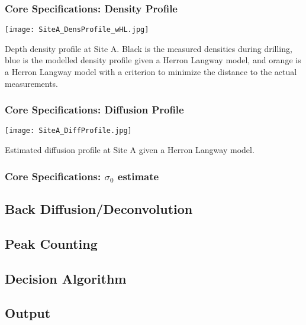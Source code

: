 \documentclass[../../CompleteThesis/Complete_1stDraft.tex]{subfiles}
\begin{document}
\subsubsection[Density Profile]{Core Specifications: Density Profile}
\begin{marginfigure}
	\centering
	\texttt{[image: SiteA\_DensProfile\_wHL.jpg]}
	\caption[Density profile Site A]{\footnotesize{Depth density profile at Site A. Black is the measured densities during drilling, blue is the modelled density profile given a Herron Langway model, and orange is a Herron Langway model with a criterion to minimize the distance to the actual measurements.}}
	\label{Fig:SiteA_DensProfile_wHL}
\end{marginfigure}


\subsubsection[Diffusion Profile]{Core Specifications: Diffusion Profile}
\begin{marginfigure}
	\centering
	\texttt{[image: SiteA\_DiffProfile.jpg]}
	\caption[Diffusion profile, Site A.]{\footnotesize{Estimated diffusion profile at Site A given a Herron Langway model.}}
	\label{fig:SiteADiffProfile}
\end{marginfigure}

\subsubsection[$\sigma_0$ estimate]{Core Specifications: $\sigma_0$ estimate}

\subsection[Back Diffusion]{Back Diffusion/Deconvolution}

\subsection[Peak Counting]{Peak Counting}

\subsection[Decision algorithm]{Decision Algorithm}

\subsection[Output]{Output}
\end{document}
